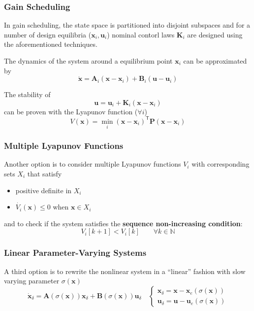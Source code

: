 \subsubsection{Gain Scheduling}
In gain scheduling, the state space is partitioned into disjoint subspaces and for a number of design equilibria ($\mathbf{x}_i, \mathbf{u}_i$)  nominal contorl laws $\mathbf{K}_i$ are designed using the aforementioned techniques.

\newpar{}
The dynamics of the system around a equilibrium point $\mathbf{x}_i$ can be approximated by
\noindent\begin{equation*}
    \dot{\mathbf{x}} = \mathbf{A}_i(\mathbf{x}-\mathbf{x}_i) + \mathbf{B}_i(\mathbf{u}-\mathbf{u}_i)
\end{equation*}

The stability of
\noindent\begin{equation*}
    \mathbf{u} = \mathbf{u}_i+\mathbf{K}_i(\mathbf{x}-\mathbf{x}_i)
\end{equation*}
can be proven with the Lyapunov function ($\forall i$)
\noindent\begin{equation*}
    V(\mathbf{x}) = \min_{i} {(\mathbf{x}-\mathbf{x}_i)}^{\mathsf{T}}\mathbf{P}(\mathbf{x}-\mathbf{x}_i)
\end{equation*}

\subsubsection{Multiple Lyapunov Functions}
Another option is to consider multiple Lyapunov functions $V_i$ with corresponding sets $X_i$ that satisfy
\begin{itemize}
    \item positive definite in $X_i$
    \item $\dot{V_i}(\mathbf{x})\leq 0$ when $\mathbf{x}\in X_i$
\end{itemize}

and to check if the system satisfies the \textbf{sequence non-increasing condition}:
\noindent\begin{equation*}
    V_i[k+1] < V_i[k] \qquad \forall k \in \mathbb{N}
\end{equation*}

\subsubsection{Linear Parameter-Varying Systems}
A third option is to rewrite the nonlinear system in a ``linear'' fashion with slow varying parameter $\sigma(\mathbf{x})$
\noindent\begin{equation*}
    \dot{\mathbf{x}}_\delta = \mathbf{A} (\sigma(\mathbf{x}))\mathbf{x}_\delta + \mathbf{B}(\sigma(\mathbf{x}))\mathbf{u}_\delta\quad
    \begin{cases}
        \mathbf{x}_\delta = \mathbf{x}-\mathbf{x}_e(\sigma(\mathbf{x})) \\
        \mathbf{u}_\delta = \mathbf{u}-\mathbf{u}_e(\sigma(\mathbf{x}))
    \end{cases}
\end{equation*}

